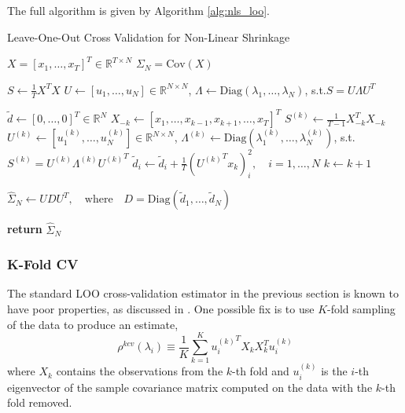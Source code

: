 \documentclass{article}
\begin{document}
The full algorithm is given by Algorithm \ref{alg:nls_loo}.

\begin{algorithm}
	\caption{Leave-One-Out Cross Validation for Non-Linear Shrinkage}
	\label{alg:nls_loo}
	\begin{algorithmic}[1]
	\Require $X = [x_1, \ldots, x_T]^T \in \mathbb{R}^{T\times N}$
	\Require $\Sigma_N = \mathrm{Cov}(X)$

		\State $S \gets \frac1T X^T X$
		\State 
				$U \gets [u_1, \ldots, u_N] \in \mathbb{R}^{N\times N}$,
				\quad $\Lambda \gets \mathrm{Diag}(\lambda_1, \ldots, \lambda_N)$,
				\quad \mbox{s.t.}\quad $S = U \Lambda {U}^T$

		\State $\tilde{d} \gets [0, \ldots, 0]^T \in \mathbb{R}^{N}$
			\State $X_{-k} \gets [x_1, \ldots, x_{k-1}, x_{k+1}, \ldots, x_T]^T$
			\State $S^{(k)} \gets \frac{1}{T-1} X_{-k}^T X_{-k} $
			\State 
				$U^{(k)} \gets [u^{(k)}_1, \ldots, u^{(k)}_N] \in \mathbb{R}^{N\times N}$,
				\quad $\Lambda^{(k)} 
					\gets \mathrm{Diag}(\lambda^{(k)}_1, \ldots, \lambda^{(k)}_N)$,
				\quad \mbox{s.t.}\quad $S^{(k)} = U^{(k)} \Lambda^{(k)} {U^{(k)}}^T$
			\State $\tilde{d}_i \gets \tilde{d}_i 
				+ \frac1T ({U^{(k)}}^T x_k)_i^2, \quad i = 1, \ldots, N$
			\State $k \gets k+1$
		\EndWhile

		\State $\hat{\Sigma}_N \gets UDU^T, \quad 
			\mbox{where}\quad D = \mathrm{Diag}(\tilde{d}_1, \ldots, \tilde{d}_N)$

		\State \textbf{return} $\hat{\Sigma}_N$ 
	\EndProcedure
	\end{algorithmic}
\end{algorithm}



\subsubsection{K-Fold CV}\label{sec:kcv}

The standard LOO cross-validation estimator in the previous section is known to
have poor properties, as discussed in \cite{Bartz2016CrossValidation}.  One
possible fix is to use $K$-fold sampling of the data to produce an estimate,
$$
	\rho^{kcv}(\lambda_i) 
		\equiv \frac1K \sum_{k=1}^K {u_i^{(k)}}^T X_k X_k^T u_i^{(k)}
$$
where $X_k$ contains the observations from the $k$-th fold and $u_i^{(k)}$ is
the $i$-th eigenvector of the sample covariance matrix computed on the data with
the $k$-th fold removed.
\end{document}
